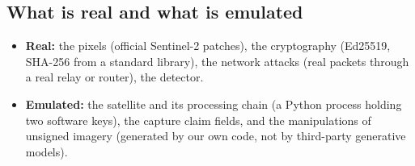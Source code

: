 \subsection{What is real and what is emulated}
\begin{itemize}
  \item \textbf{Real:} the pixels (official Sentinel-2 patches), the cryptography (Ed25519, SHA-256 from a standard library), the network attacks (real packets through a real relay or router), the detector.
  \item \textbf{Emulated:} the satellite and its processing chain (a Python process holding two software keys), the capture claim fields, and the manipulations of unsigned imagery (generated by our own code, not by third-party generative models).
\end{itemize}
